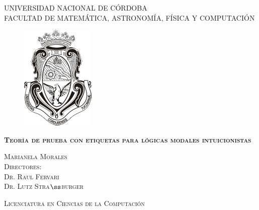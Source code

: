 \documentclass[a4paper,12pt,oneside,spanish]{book}
\newlength{\crestheight}
\begin{document}

\newtheorem{teo}{Teorema} 
\newtheorem{lemma}{Lema}

\theoremstyle{definition}
\newtheorem{dfn}{Definición}




\begin{titlepage}
\begin{center}

\textsc{\Large UNIVERSIDAD NACIONAL DE CÓRDOBA}\\[1em]
\textsc{FACULTAD DE MATEMÁTICA, ASTRONOMÍA, FÍSICA Y COMPUTACIÓN}
\vspace{4mm}
\begin{figure}[h]
\begin{center}
\includegraphics[height=\crestheight]{unc.png}
\end{center}
\end{figure}

\vspace{4mm}

\textsc{\huge \textbf{Teoría de prueba con etiquetas para lógicas modales intuicionistas}}\\

\vspace{15mm}

\textsc{\Large Marianela Morales}\\[4em]

\textsc{\large Directores:\\\vspace{2mm} Dr. Raul Fervari \\ Dr. Lutz Stra$\ss$burger}

\vspace{15mm}
\textsc{\Large Licenciatura en Ciencias de la Computación}\\[1em]
\bigskip
\bigskip


\end{center}
\end{titlepage}
\end{document}
